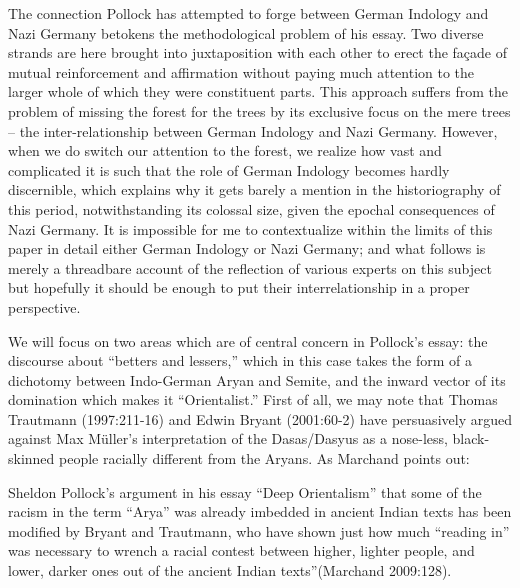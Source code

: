 The connection Pollock has attempted to forge between German Indology and Nazi Germany betokens the methodological problem of his essay. Two diverse strands are here brought into juxtaposition with each other to erect the  façade of mutual reinforcement and affirmation without paying much attention to the larger whole of which they were constituent parts. This approach suffers from the problem of missing the forest for the trees by its exclusive focus on the mere trees – the inter-relationship between German Indology and Nazi Germany. However, when we do switch our attention to the forest, we realize how vast and complicated it is such that the role of German Indology becomes hardly discernible, which explains why it gets barely a mention in the historiography of this period,  notwithstanding its colossal size, given the epochal consequences of Nazi Germany. It is impossible for me to contextualize within the limits of this paper in detail either German Indology or Nazi Germany; and what follows is merely a threadbare account of the reflection of various experts on this subject but hopefully it should be enough to put their interrelationship in a proper perspective.

We will focus on two areas which are of central concern in Pollock’s essay: the discourse about “betters and lessers,” which in this case takes the form of a dichotomy between Indo-German Aryan and Semite, and the inward vector of its domination which makes it “Orientalist.” First of all, we may note that Thomas Trautmann (1997:211-16) and Edwin Bryant (2001:60-2) have persuasively argued against Max Müller’s interpretation of the Dasas/Dasyus as a nose-less, black-skinned people racially different from the Aryans. As Marchand points out:

\begin{myquote}
Sheldon Pollock’s argument in his essay “Deep Orientalism” that some of the racism in the term “Arya” was already imbedded in ancient Indian texts has been modified by Bryant and Trautmann, who have shown just how much “reading in” was necessary to wrench a racial contest between higher, lighter people, and lower, darker ones out of the ancient Indian texts”\hfill (Marchand 2009:128). 
\end{myquote}

